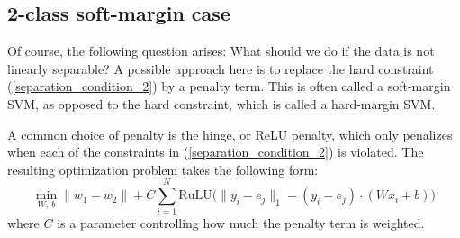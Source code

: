 \subsection{2-class soft-margin case}

Of course, the following question arises: What should we do if the data is not linearly separable? A possible approach here is to 
replace the hard constraint (\ref{separation_condition_2}) by a penalty term. This is often called a soft-margin SVM,
as opposed to the hard constraint, which is called a hard-margin SVM.

A common choice of penalty is the hinge, or ReLU penalty, which only penalizes when each of the constraints
in (\ref{separation_condition_2}) is violated. The resulting optimization problem takes the following form:
\begin{equation}
 \min_{W,~b} \|w_1-w_2\| + C\displaystyle\sum_{i=1}^N \text{RuLU}\Big(\|y_i - e_j\|_1- (y_i - e_j)\cdot (Wx_i+b) \Big)
\end{equation}
where $C$ is a parameter controlling how much the penalty term is weighted.
